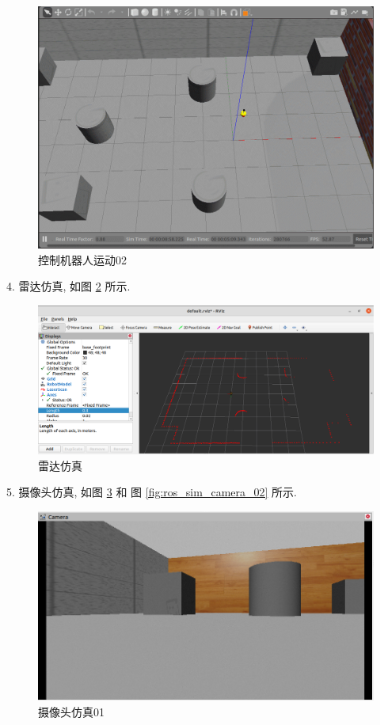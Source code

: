 \documentclass[openany, fontset=windowsold]{ctexbook}
\theoremstyle{kaiti}
\theoremstyle{normal}
\begin{document}
\begin{figure}[!ht]
  \centering
  \includegraphics[width=.7\textwidth]{ros_sim_control_robot_global.png}
  \caption{控制机器人运动02}
  \label{fig:ros_sim_control_robot_global}
\end{figure}

4. 雷达仿真, 如图 \ref{fig:ros_sim_lidar} 所示.

\begin{figure}[!ht]
  \centering
  \includegraphics[width=.9\textwidth]{ros_sim_lidar.png}
  \caption{雷达仿真}
  \label{fig:ros_sim_lidar}
\end{figure}

5. 摄像头仿真, 如图 \ref{fig:ros_sim_camera_01} 和 图 \ref{fig:ros_sim_camera_02} 所示.

\begin{figure}[!ht]
  \centering
  \includegraphics[width=.9\textwidth]{ros_sim_camera_01.png}
  \caption{摄像头仿真01}
  \label{fig:ros_sim_camera_01}
\end{figure}
\end{document}
